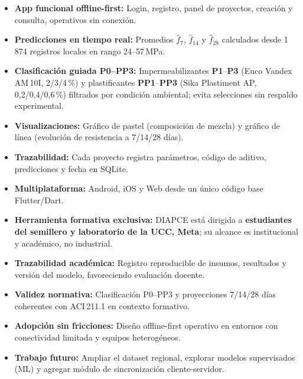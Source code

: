 \documentclass[10pt]{article}
\begin{document}
\hfill
\begin{minipage}[t]{0.2425\textwidth}

  \begin{tcolorbox}[tealbox, title=Resultados]
    \small
    \begin{itemize}[leftmargin=12pt, topsep=1pt, itemsep=1pt]
      \item \textbf{App funcional offline-first:} Login, registro, panel de
            proyectos, creación y consulta, operativos sin conexión.
      \item \textbf{Predicciones en tiempo real:} Promedios $\hat{f}_7$,
            $\hat{f}_{14}$ y $\hat{f}_{28}$ calculados desde 1\,874 registros
            locales en rango 24–57\,MPa.
      \item \textbf{Clasificación guiada P0–PP3:} Impermeabilizantes
            \textbf{P1}–\textbf{P3} (Euco Vandex AM\,10I, 2/3/4\,\%) y
            plastificantes \textbf{PP1}–\textbf{PP3} (Sika Plastiment AP,
            0{,}2/0{,}4/0{,}6\,\%) filtrados por condición ambiental;
            evita selecciones sin respaldo experimental.
      \item \textbf{Visualizaciones:} Gráfico de pastel (composición de mezcla)
            y gráfico de línea (evolución de resistencia a 7/14/28 días).
      \item \textbf{Trazabilidad:} Cada proyecto registra parámetros,
            código de aditivo, predicciones y fecha en SQLite.
      \item \textbf{Multiplataforma:} Android, iOS y Web desde un único
            código base Flutter/Dart.
    \end{itemize}
  \end{tcolorbox}

  \begin{tcolorbox}[posterbox, title=Conclusiones]
    \small
    \begin{itemize}[leftmargin=12pt, topsep=1pt, itemsep=1pt]
      \item \textbf{Herramienta formativa exclusiva:} DIAPCE está dirigida a
            \textbf{estudiantes del semillero y laboratorio de la UCC, Meta};
            su alcance es institucional y académico, no industrial.
      \item \textbf{Trazabilidad académica:} Registro reproducible de insumos,
            resultados y versión del modelo, favoreciendo evaluación docente.
      \item \textbf{Validez normativa:} Clasificación P0–PP3 y proyecciones
            7/14/28 días coherentes con ACI\,211.1 en contexto formativo.
      \item \textbf{Adopción sin fricciones:} Diseño offline-first operativo
            en entornos con conectividad limitada y equipos heterogéneos.
      \item \textbf{Trabajo futuro:} Ampliar el dataset regional, explorar
            modelos supervisados (ML) y agregar módulo de sincronización
            cliente-servidor.
    \end{itemize}
  \end{tcolorbox}


\end{minipage}
\end{document}
